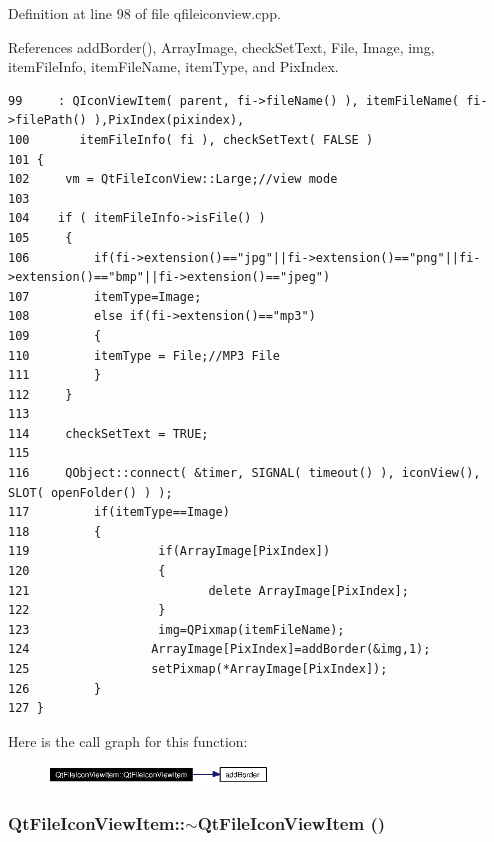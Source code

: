 Definition at line 98 of file qfileiconview.cpp.

References add\-Border(), Array\-Image, check\-Set\-Text, File, Image, img, item\-File\-Info, item\-File\-Name, item\-Type, and Pix\-Index.



\footnotesize\begin{verbatim}99     : QIconViewItem( parent, fi->fileName() ), itemFileName( fi->filePath() ),PixIndex(pixindex),
100       itemFileInfo( fi ), checkSetText( FALSE )
101 {
102     vm = QtFileIconView::Large;//view mode
103 
104    if ( itemFileInfo->isFile() )
105     {
106         if(fi->extension()=="jpg"||fi->extension()=="png"||fi->extension()=="bmp"||fi->extension()=="jpeg")
107         itemType=Image;
108         else if(fi->extension()=="mp3")
109         {
110         itemType = File;//MP3 File
111         }
112     }
113 
114     checkSetText = TRUE;
115 
116     QObject::connect( &timer, SIGNAL( timeout() ), iconView(), SLOT( openFolder() ) );
117         if(itemType==Image)
118         {
119                  if(ArrayImage[PixIndex])
120                  {
121                         delete ArrayImage[PixIndex];
122                  }
123                  img=QPixmap(itemFileName);
124                 ArrayImage[PixIndex]=addBorder(&img,1);
125                 setPixmap(*ArrayImage[PixIndex]);
126         }
127 }
\end{verbatim}\normalsize 


Here is the call graph for this function:\begin{figure}[H]
\begin{center}
\leavevmode
\includegraphics[width=166pt]{classQtFileIconViewItem_QtFileIconViewItema0_cgraph}
\end{center}
\end{figure}
\subsubsection{\setlength{\rightskip}{0pt plus 5cm}Qt\-File\-Icon\-View\-Item::$\sim${\bf Qt\-File\-Icon\-View\-Item} ()\hspace{0.3cm}{\tt  [virtual]}}\label{classQtFileIconViewItem_QtFileIconViewItema1}




